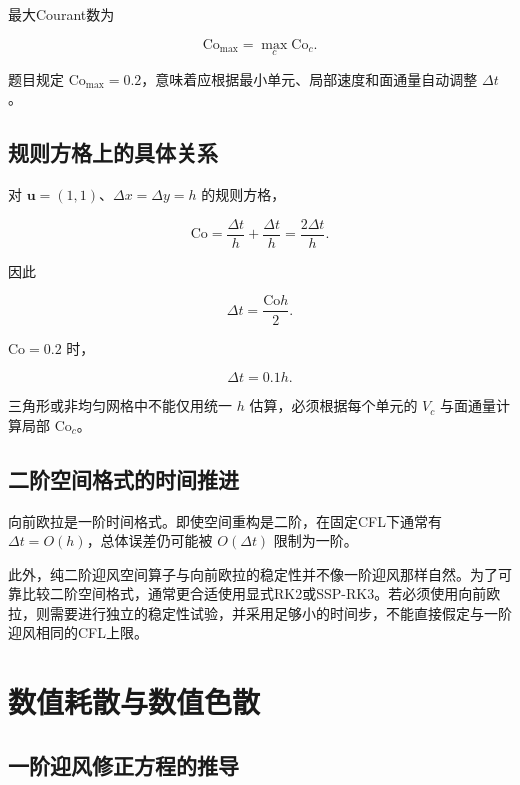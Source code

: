 \documentclass[UTF8,12pt,a4paper,fontset=fandol]{ctexart}
\numberwithin{equation}{section}
\newcommand{\Co}{\mathrm{Co}}
\newcommand{\Cmax}{\mathrm{Co}_{\max}}
\begin{document}
最大Courant数为

\begin{equation}
  \Cmax=\max_c\Co_c.
\end{equation}

题目规定 $\Cmax=0.2$，意味着应根据最小单元、局部速度和面通量自动调整 $\Delta t$。

\subsection{规则方格上的具体关系}

对 $\bm u=(1,1)$、$\Delta x=\Delta y=h$ 的规则方格，

\begin{equation}
  \Co
  =
  \frac{\Delta t}{h}
  +
  \frac{\Delta t}{h}
  =
  \frac{2\Delta t}{h}.
\end{equation}

因此

\begin{equation}
  \Delta t
  =
  \frac{\Co h}{2}.
\end{equation}

$\Co=0.2$ 时，

\begin{equation}
  \Delta t=0.1h.
\end{equation}

三角形或非均匀网格中不能仅用统一 $h$ 估算，必须根据每个单元的 $V_c$ 与面通量计算局部 $\Co_c$。

\subsection{二阶空间格式的时间推进}

向前欧拉是一阶时间格式。即使空间重构是二阶，在固定CFL下通常有 $\Delta t=O(h)$，总体误差仍可能被 $O(\Delta t)$ 限制为一阶。

此外，纯二阶迎风空间算子与向前欧拉的稳定性并不像一阶迎风那样自然。为了可靠比较二阶空间格式，通常更合适使用显式RK2或SSP-RK3。若必须使用向前欧拉，则需要进行独立的稳定性试验，并采用足够小的时间步，不能直接假定与一阶迎风相同的CFL上限。

\section{数值耗散与数值色散}

\subsection{一阶迎风修正方程的推导}
\end{document}

